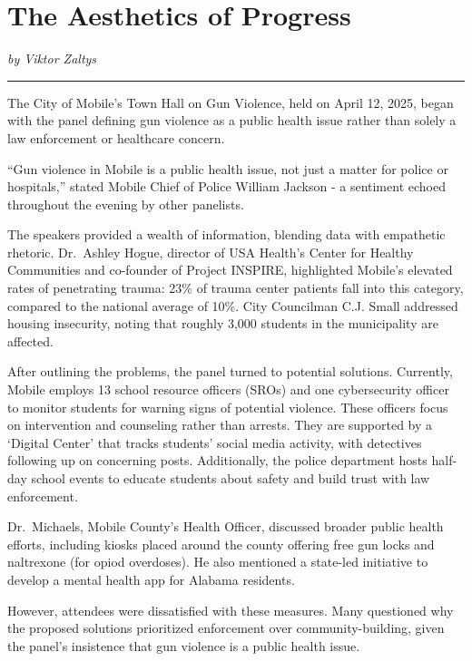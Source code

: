 \documentclass[
]{book}
\begin{document}
\section*{The Aesthetics of Progress}\label{the-aesthetics-of-progress}

\emph{by Viktor Zaltys}

\begin{center}\rule{0.5\linewidth}{0.5pt}\end{center}

The City of Mobile's Town Hall on Gun Violence, held on April 12, 2025, began with the panel defining gun violence as a public health issue rather than solely a law enforcement or healthcare concern.

``Gun violence in Mobile is a public health issue, not just a matter for police or hospitals,'' stated Mobile Chief of Police William Jackson - a sentiment echoed throughout the evening by other panelists.

The speakers provided a wealth of information, blending data with empathetic rhetoric. Dr.~Ashley Hogue, director of USA Health's Center for Healthy Communities and co-founder of Project INSPIRE, highlighted Mobile's elevated rates of penetrating trauma: 23\% of trauma center patients fall into this category, compared to the national average of 10\%. City Councilman C.J. Small addressed housing insecurity, noting that roughly 3,000 students in the municipality are affected.

After outlining the problems, the panel turned to potential solutions. Currently, Mobile employs 13 school resource officers (SROs) and one cybersecurity officer to monitor students for warning signs of potential violence. These officers focus on intervention and counseling rather than arrests. They are supported by a `Digital Center' that tracks students' social media activity, with detectives following up on concerning posts. Additionally, the police department hosts half-day school events to educate students about safety and build trust with law enforcement.

Dr.~Michaels, Mobile County's Health Officer, discussed broader public health efforts, including kiosks placed around the county offering free gun locks and naltrexone (for opiod overdoses). He also mentioned a state-led initiative to develop a mental health app for Alabama residents.

However, attendees were dissatisfied with these measures. Many questioned why the proposed solutions prioritized enforcement over community-building, given the panel's insistence that gun violence is a public health issue.
\end{document}
